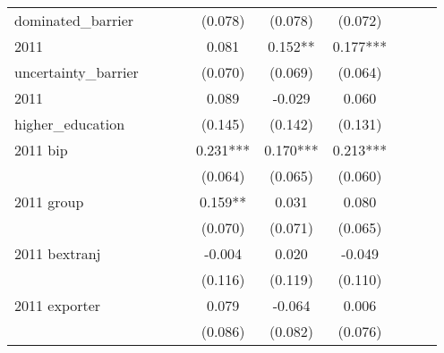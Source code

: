 \begin{table}[htbp]
\begin{tabular}{l*{9}{c}}
dominated\_barrier   &               &               &               &     (0.078)   &     (0.078)   &     (0.072)   &               &               &               \\
2011                &               &               &               &       0.081   &       0.152** &       0.177***&               &               &               \\
uncertainty\_barrier &               &               &               &     (0.070)   &     (0.069)   &     (0.064)   &               &               &               \\
2011                &               &               &               &       0.089   &      -0.029   &       0.060   &               &               &               \\
higher\_education    &               &               &               &     (0.145)   &     (0.142)   &     (0.131)   &               &               &               \\
2011 bip            &               &               &               &       0.231***&       0.170***&       0.213***&               &               &               \\
                    &               &               &               &     (0.064)   &     (0.065)   &     (0.060)   &               &               &               \\
2011 group          &               &               &               &       0.159** &       0.031   &       0.080   &               &               &               \\
                    &               &               &               &     (0.070)   &     (0.071)   &     (0.065)   &               &               &               \\
2011 bextranj       &               &               &               &      -0.004   &       0.020   &      -0.049   &               &               &               \\
                    &               &               &               &     (0.116)   &     (0.119)   &     (0.110)   &               &               &               \\
2011 exporter       &               &               &               &       0.079   &      -0.064   &       0.006   &               &               &               \\
                    &               &               &               &     (0.086)   &     (0.082)   &     (0.076)   &               &               &               \\

\end{tabular}
\end{table}
